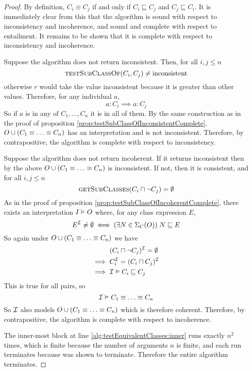\documentclass[paper.tex]{subfiles}
\begin{document}
\begin{proof}
  By definition, $C_i \equiv C_j$ if and only if $C_i \sqsubseteq C_j$ and $C_j \sqsubseteq C_i$.  It is immediately clear from this that the algorithm is sound with respect to inconsistency and incoherence, and sound and complete with respect to entailment.  It remains to be shown that it is complete with respect to inconsistency and incoherence.

  Suppose the algorithm does not return inconsistent.  Then, for all $i,j \le n$
  \[ \Call{testSubClassOf}{C_i, C_j} \ne \inconsistent \]
  otherwise $r$ would take the value inconsistent because it is greater than other values.
  Therefore, for any individual $a$,
  \[ a : C_i \implies a : C_j \]
  So if $a$ is in any of $C_1, \ldots, C_n$ it is in all of them.  By the same construction as in the proof of proposition \ref{prop:testSubClassOfInconsistentComplete}, $O \cup (C_1 \equiv \ldots \equiv C_n)$ has an interpretation and is not inconsistent.  Therefore, by contrapositive, the algorithm is complete with respect to inconsistency.

  Suppose the algorithm does not return incoherent.  If it returns inconsistent then by the above $O \cup (C_1 \equiv \ldots \equiv C_n)$ is inconsistent.  If not, then it is consistent, and for all $i,j \le n$
  \[ \Call{getSubClasses}{C_i \sqcap \neg C_j} = \emptyset \]
  As in the proof of proposition \ref{prop:testSubClassOfIncoherentComplete}, there exists an interpretation $I \vDash O$ where, for any class expression $E$,
  \[ E^{\mathcal{I}} \ne \emptyset \iff (\exists N \in \Sigma_C(O)) \; N \sqsubseteq E \]
  So again under $O \cup (C_1 \equiv \ldots \equiv C_n)$ we have
  \begin{align*}
    & (C_i \sqcap \neg C_j)^{\mathcal{I}} = \emptyset \\
    \implies{}& C_i^{\mathcal{I}} = (C_i \sqcap C_j)^{\mathcal{I}} \\
    \implies{}& \mathcal{I} \vDash C_i \sqsubseteq C_j
  \end{align*}
  This is true for all pairs, so
  \[ \mathcal{I} \vDash C_1 \equiv \ldots \equiv C_n \]
  So $\mathcal{I}$ also models $O \cup (C_1 \equiv \ldots \equiv C_n)$ which is therefore coherent.  Therefore, by contrapositive, the algorithm is complete with respect to incoherence.

  The inner-most block at line \ref{alg:testEquivalentClasses:inner} runs exactly $n^2$ times, which is finite because the number of arguments $n$ is finite, and each run terminates because  was shown to terminate.  Therefore the entire algorithm terminates.
\end{proof}
\end{document}

